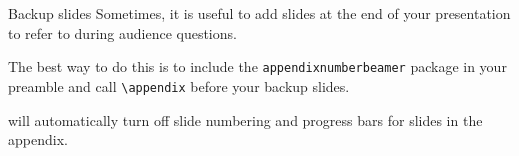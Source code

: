 \begin{frame}[fragile]{Backup slides}
	Sometimes, it is useful to add slides at the end of your presentation to
	refer to during audience questions.

	The best way to do this is to include the \verb|appendixnumberbeamer|
	package in your preamble and call \verb|\appendix| before your backup slides.

	will automatically turn off slide numbering and progress bars for
	slides in the appendix.
\end{frame}
